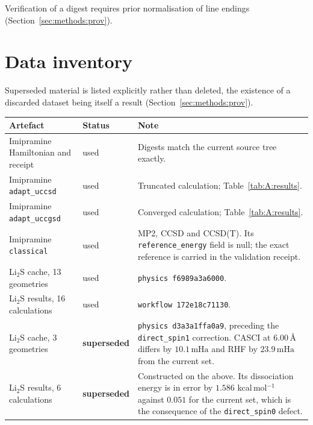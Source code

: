 \documentclass[11pt,a4paper]{article}
\newcommand{\mHa}{\ensuremath{\,\mathrm{mHa}}}
\newcommand{\Ang}{\ensuremath{\,\text{\AA}}}
\newcommand{\code}[1]{\texttt{\small #1}}
\newcommand{\LiS}{\texorpdfstring{Li$_2$S}{Li2S}}
\begin{document}
Verification of a digest requires prior normalisation of line endings
(Section~\ref{sec:methods:prov}).

\section{Data inventory}
\label{app:data}

Superseded material is listed explicitly rather than deleted, the existence of
a discarded dataset being itself a result
(Section~\ref{sec:methods:prov}).

\begin{center}
\small
\begin{tabular}{@{}llp{7.0cm}@{}}
\toprule
Artefact & Status & Note \\
\midrule
Imipramine Hamiltonian and receipt & used & Digests match the current source tree exactly. \\
Imipramine \code{adapt\_uccsd}   & used & Truncated calculation; Table~\ref{tab:A:results}. \\
Imipramine \code{adapt\_uccgsd}  & used & Converged calculation; Table~\ref{tab:A:results}. \\
Imipramine \code{classical}      & used & MP2, CCSD and CCSD(T). Its
                                          \code{reference\_energy} field is null;
                                          the exact reference is carried in the
                                          validation receipt. \\
\LiS{} cache, 13 geometries      & used & \code{physics f6989a3a6000}. \\
\LiS{} results, 16 calculations  & used & \code{workflow 172e18c71130}. \\
\midrule
\LiS{} cache, 3 geometries       & \textbf{superseded} & \code{physics d3a3a1ffa0a9},
                                          preceding the \code{direct\_spin1}
                                          correction. CASCI at $6.00\Ang$ differs by
                                          $10.1\mHa$ and RHF by $23.9\mHa$ from the
                                          current set. \\
\LiS{} results, 6 calculations   & \textbf{superseded} & Constructed on the above.
                                          Its dissociation energy is in error by
                                          $1.586$ kcal\,mol$^{-1}$ against $0.051$
                                          for the current set, which is the
                                          consequence of the \code{direct\_spin0}
                                          defect. \\
\bottomrule
\end{tabular}
\end{center}
\end{document}
